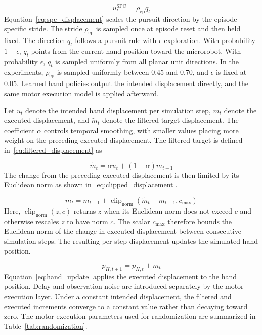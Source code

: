 \documentclass[journal,twoside,web]{ieeecolor2}
\begin{document}
\begin{equation}
u_t^{\mathrm{SPC}} = \rho_{\mathrm{ep}} q_t
\label{eq:spc_displacement}
\end{equation}
Equation~\eqref{eq:spc_displacement} scales the pursuit direction by the episode-specific stride. The stride $\rho_{\mathrm{ep}}$ is sampled once at episode reset and then held fixed. The direction $q_t$ follows a pursuit rule with $\epsilon$ exploration. With probability $1-\epsilon$, $q_t$ points from the current hand position toward the microrobot. With probability $\epsilon$, $q_t$ is sampled uniformly from all planar unit directions. In the experiments, $\rho_{\mathrm{ep}}$ is sampled uniformly between 0.45 and 0.70, and $\epsilon$ is fixed at 0.05. Learned hand policies output the intended displacement directly, and the same motor execution model is applied afterward.

Let $u_t$ denote the intended hand displacement per simulation step, $m_t$ denote the executed displacement, and $\widetilde{m}_t$ denote the filtered target displacement. The coefficient $\alpha$ controls temporal smoothing, with smaller values placing more weight on the preceding executed displacement. The filtered target is defined in~\eqref{eq:filtered_displacement} as

\begin{equation}
\widetilde{m}_t = \alpha u_t + (1-\alpha)m_{t-1}
\label{eq:filtered_displacement}
\end{equation}
The change from the preceding executed displacement is then limited by its Euclidean norm as shown in~\eqref{eq:clipped_displacement}.

\begin{equation}
m_t = m_{t-1} + \operatorname{clip}_{\mathrm{norm}}(\widetilde{m}_t-m_{t-1},c_{\max})
\label{eq:clipped_displacement}
\end{equation}
Here, $\operatorname{clip}_{\mathrm{norm}}(z,c)$ returns $z$ when its Euclidean norm does not exceed $c$ and otherwise rescales $z$ to have norm $c$. The scalar $c_{\max}$ therefore bounds the Euclidean norm of the change in executed displacement between consecutive simulation steps. The resulting per-step displacement updates the simulated hand position.

\begin{equation}
p_{H,t+1} = p_{H,t} + m_t
\label{eq:hand_update}
\end{equation}
Equation~\eqref{eq:hand_update} applies the executed displacement to the hand position. Delay and observation noise are introduced separately by the motor execution layer. Under a constant intended displacement, the filtered and executed increments converge to a constant value rather than decaying toward zero. The motor execution parameters used for randomization are summarized in Table~\ref{tab:randomization}.
\end{document}
